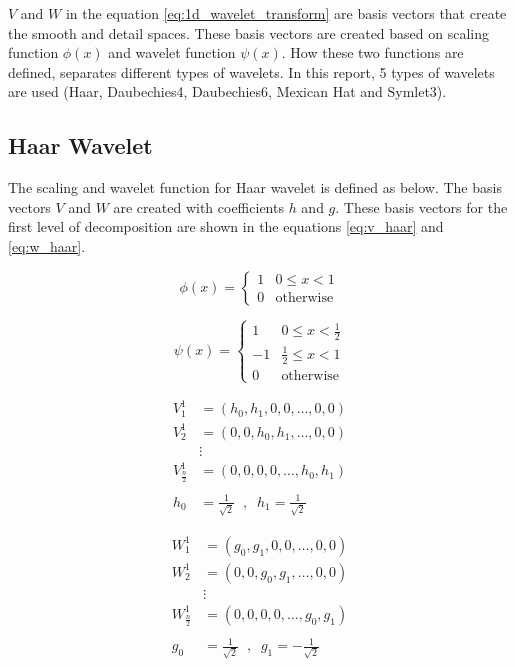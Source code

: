\documentclass[12pt]{article}
\begin{document}
	$V$ and $W$ in the equation \ref{eq:1d_wavelet_transform} are basis vectors that create the smooth and detail spaces. These basis vectors are created based on scaling function $\phi(x)$ and wavelet function $\psi(x)$. How these two functions are defined, separates different types of wavelets. In this report, 5 types of wavelets are used (Haar, Daubechies4, Daubechies6, Mexican Hat and Symlet3).

	\subsection{Haar Wavelet}
	
	The scaling and wavelet function for Haar wavelet is defined as below. The basis vectors $V$ and $W$ are created with coefficients $h$ and $g$. These basis vectors for the first level of decomposition are shown in the equations \ref{eq:v_haar} and \ref{eq:w_haar}.
	
	\begin{equation}
		\phi(x) = 
		\begin{cases} 
			1 &  0 \leq x < 1 \\
			0 & \text{otherwise}
		\end{cases}
		\label{eq:scalingfunc_haar}
	\end{equation}
	
	\begin{equation}
		\psi(x) = 
		\begin{cases} 
			1 &  0 \leq x < \frac{1}{2} \\
			-1 &  \frac{1}{2} \leq x < 1 \\
			0 & \text{otherwise}
		\end{cases}
		\label{eq:waveletfunc_haar}
	\end{equation}
	
	\begin{equation}
		\begin{aligned}
			V_1^1 &= (h_0, h_1, 0, 0, \dots, 0, 0) \\
			V_2^1 &= (0, 0, h_0, h_1, \dots, 0, 0) \\
			&\vdots \\
			V_{\frac{n}{2}}^1 &= (0, 0, 0, 0, \dots, h_0, h_1)\\
			\\
			h_0 &= \frac{1}{\sqrt{2}} \;\;,\;\; h_1 = \frac{1}{\sqrt{2}}
		\end{aligned}
		\label{eq:v_haar}
	\end{equation}
	
	\begin{equation}
		\begin{aligned}
			W_1^1 &= (g_0, g_1, 0, 0, \dots, 0, 0) \\
			W_2^1 &= (0, 0, g_0, g_1, \dots, 0, 0) \\
			&\vdots \\
			W_{\frac{n}{2}}^1 &= (0, 0, 0, 0, \dots, g_0, g_1)\\
			\\
			g_0 &= \frac{1}{\sqrt{2}} \;\;,\;\; g_1 = -\frac{1}{\sqrt{2}}
		\end{aligned}
		\label{eq:w_haar}
	\end{equation}
	
\end{document}
